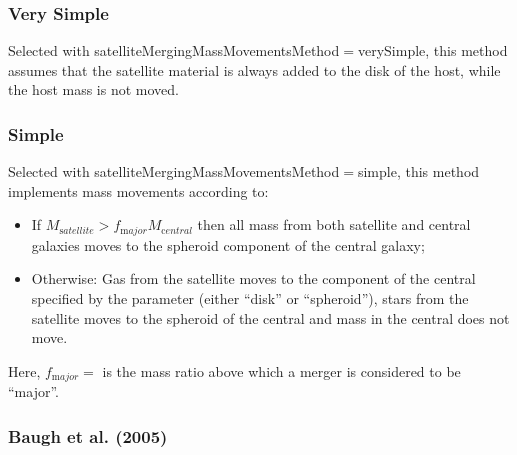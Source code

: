 \subsubsection{Very Simple}

Selected with {\normalfont \ttfamily satelliteMergingMassMovementsMethod}$=${\normalfont \ttfamily verySimple}, this method assumes that the satellite material is always added to the disk of the host, while the host mass is not moved.

\subsubsection{Simple}

Selected with {\normalfont \ttfamily satelliteMergingMassMovementsMethod}$=${\normalfont \ttfamily simple}, this method implements mass movements according to:
\begin{itemize}
 \item If $M_{\mathrm satellite} > f_{\mathrm major} M_{\mathrm central}$ then all mass from both satellite and central galaxies moves to the spheroid \gls{component} of the central galaxy;
 \item Otherwise: Gas from the satellite moves to the \gls{component} of the central specified by the {\normalfont \ttfamily [minorMergerGasMovesTo]} parameter (either ``{\normalfont \ttfamily disk}'' or ``{\normalfont \ttfamily spheroid}''), stars from the satellite moves to the spheroid of the central and mass in the central does not move.
\end{itemize}
Here, $f_{\mathrm major}=${\normalfont \ttfamily [majorMergerMassRatio]} is the mass ratio above which a merger is considered to be ``major''.

\subsubsection{Baugh et al. (2005)}

